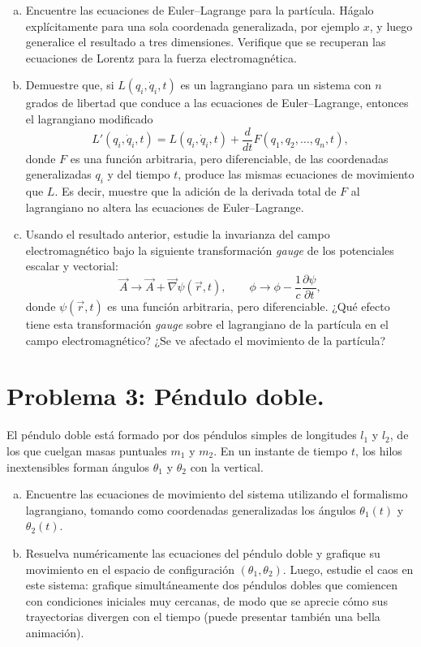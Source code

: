 \documentclass[a4paper]{article}
\begin{document}
\begin{enumerate}[a)]
  \item Encuentre las ecuaciones de Euler--Lagrange para la partícula. Hágalo explícitamente para una sola coordenada generalizada, por ejemplo $x$, y luego generalice el resultado a tres dimensiones. Verifique que se recuperan las ecuaciones de Lorentz para la fuerza electromagnética.
  
  \item Demuestre que, si $L(q_i, \dot{q}_i, t)$ es un lagrangiano para un sistema con $n$ grados de libertad que conduce a las ecuaciones de Euler--Lagrange, entonces el lagrangiano modificado
  $$L'(q_i, \dot{q}_i, t) = L(q_i, \dot{q}_i, t) + \frac{d}{dt}F(q_1, q_2, \dots, q_n, t),$$
  donde $F$ es una función arbitraria, pero diferenciable, de las coordenadas generalizadas $q_i$ y del tiempo $t$, produce las mismas ecuaciones de movimiento que $L$. Es decir, muestre que la adición de la derivada total de $F$ al lagrangiano no altera las ecuaciones de Euler--Lagrange.
  
  \item Usando el resultado anterior, estudie la invarianza del campo electromagnético bajo la siguiente transformación \textit{gauge} de los potenciales escalar y vectorial:
  $$\vec{A} \rightarrow \vec{A} + \vec{\nabla}\psi(\vec{r}, t), \qquad \phi \rightarrow \phi - \frac{1}{c}\frac{\partial \psi}{\partial t},$$
  donde $\psi(\vec{r}, t)$ es una función arbitraria, pero diferenciable. ¿Qué efecto tiene esta transformación \textit{gauge} sobre el lagrangiano de la partícula en el campo electromagnético? ¿Se ve afectado el movimiento de la partícula?
\end{enumerate}

\section{Problema 3: Péndulo doble.}

El péndulo doble está formado por dos péndulos simples de longitudes $l_1$ y $l_2$, de los que cuelgan masas puntuales $m_1$ y $m_2$. En un instante de tiempo $t$, los hilos inextensibles forman ángulos $\theta_1$ y $\theta_2$ con la vertical.

\begin{enumerate}[a)]
    \item Encuentre las ecuaciones de movimiento del sistema utilizando el formalismo lagrangiano, tomando como coordenadas generalizadas los ángulos $\theta_1(t)$ y $\theta_2(t)$.
    
    \item Resuelva numéricamente las ecuaciones del péndulo doble y grafique su movimiento en el espacio de configuración $(\theta_1, \theta_2)$. Luego, estudie el caos en este sistema: grafique simultáneamente dos péndulos dobles que comiencen con condiciones iniciales muy cercanas, de modo que se aprecie cómo sus trayectorias divergen con el tiempo (puede presentar también una bella animación).
\end{enumerate}
\end{document}
